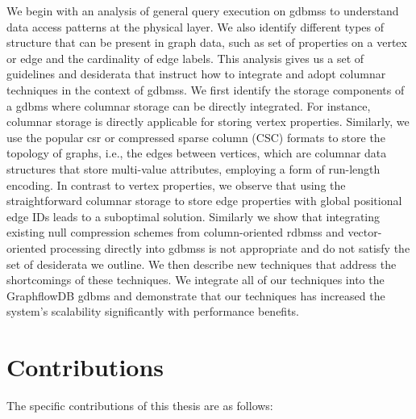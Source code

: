 We begin with an analysis of general query execution on \gls{gdbms}s to understand data access patterns at the physical layer. We also identify different types of structure that can be present in graph data, such as set of properties on a vertex or edge and the cardinality of edge labels. This analysis gives us a set of guidelines and desiderata that instruct how to integrate and adopt columnar techniques in the context of \gls{gdbms}s. We first identify the storage components of a \gls{gdbms} where columnar storage can be directly integrated. For instance, columnar storage is directly applicable for storing vertex properties. Similarly, we use the popular \gls{csr} or compressed sparse column (CSC) formats to store the topology of graphs, i.e., the edges between vertices, which are columnar data structures that store multi-value attributes, employing a form of run-length encoding. In contrast to vertex properties, we observe that using the straightforward columnar storage to store edge properties with global positional edge IDs leads to a suboptimal solution. Similarly we show that integrating existing null compression schemes from column-oriented \gls{rdbms}s and vector-oriented processing directly into \gls{gdbms}s is not appropriate and do not satisfy the set of desiderata we outline. We then describe new techniques that address the shortcomings of these techniques. We integrate all of our techniques into the GraphflowDB \gls{gdbms} and demonstrate that our techniques has increased the system's scalability significantly with performance benefits.

\section{Contributions}

The specific contributions of this thesis are as follows:

